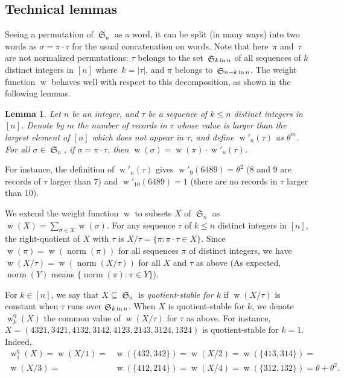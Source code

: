 \documentclass[proceedings]{aofa}
\newcommand{\wqotk}[2]{\weight^{\quotient}_{#1}(#2)}
\DeclareMathOperator{\sym}{\mathfrak{S}}
\DeclareMathOperator{\weight}{w}
\DeclareMathOperator{\quotient}{q}
\DeclareMathOperator{\norm}{norm}
\newcommand{\symin}[2]{\sym_{#1 \text{\,in\,} #2}}
\newtheorem{lemma}[theorem]{Lemma}
\begin{document}
\subsection{Technical lemmas}

Seeing a permutation of $\sym_{n}$ as a word, it can be split (in many ways) 
into two words as $\sigma = \pi\cdot\tau$ for the usual concatenation on words. 
Note that here~$\pi$ and~$\tau$ are not normalized permutations:  $\tau$ belongs to the set~$\symin{k}{n}$ of all sequences of $k$ distinct integers in $[n]$ where~$k=|\tau|$, and $\pi$ belongs to~$\symin{n-k}{n}$.
The weight function $\weight$ behaves well with respect to this decomposition, as shown in the following lemmas. 

\begin{lemma}\label{lem:weight prime}
Let $n$ be an integer, and $\tau$ be a sequence of $k \leq n$ distinct integers in $[n]$. 
Denote by $m$ the number of records in $\tau$ whose value is larger than the largest element of $[n]$ which does not appear in $\tau$,
and define $\weight'_{n}(\tau)$ as $\theta^{m}$. 
For all $\sigma \in \sym_n$, if $\sigma = \pi\cdot\tau$, then $\weight(\sigma) = \weight(\pi) \cdot \weight'_{n}(\tau)$.
\end{lemma}

For instance, the definition of $\weight'_{n}(\tau)$ gives $\weight'_{9}(6489)= \theta^2$ ($8$ and $9$ are records of $\tau$ larger than $7$) 
and $\weight'_{10}(6489)= 1$ (there are no records in $\tau$ larger than $10$). 

We extend the weight function $\weight$ to subsets $X$ of $\sym_{n}$ as $\weight(X)=\sum_{\sigma\in X}\weight(\sigma)$. 
For any sequence $\tau$ of $k \leq n$ distinct integers in $[n]$, the right-quotient of $X$ with $\tau$ is $X/\tau = \{\pi:\pi\cdot\tau\in X\}$. 
Since $\weight(\pi) = \weight(\norm(\pi))$ for all sequences $\pi$ of distinct integers, 
we have $\weight(X/\tau) = \weight(\norm(X/\tau))$ for all $X$ and $\tau$ as above 
(As expected, $\norm(Y)$ means $\{\norm(\pi) : \pi \in Y\}$).



For $k\in[n]$, we say that $X \subseteq \sym_{n}$ is \emph{quotient-stable for $k$} if  
$\weight(X/\tau)$ is constant when $\tau$ runs over $\symin{k}n$. When $X$ is quotient-stable for $k$, we denote $\wqotk{k}{X}$ the common value of $\weight(X/\tau)$ for $\tau$ as above. 
For instance, $X=(4321,3421,4132,3142,4123,2143,3124,1324)$ is quotient-stable for $k=1$. Indeed, 
\begin{align*}
\wqotk{1}{X}=\weight(X/1)=&\weight(\{432,342\})=
\weight(X/2)=\weight(\{413,314\})=\\
\weight(X/3)=&\weight(\{412,214\})=
\weight(X/4)=\weight(\{312,132\})=\theta+\theta^2.
\end{align*}
\end{document}
